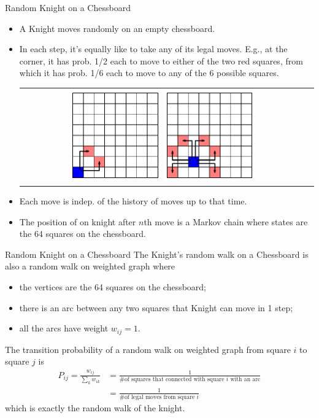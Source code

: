 \documentclass[letterpaper, mathserif]{beamer}
\begin{document}
\begin{frame}{Random Knight on a Chessboard}
\begin{itemize}
\item A Knight moves randomly on an empty chessboard.
\item In each step, it's equally like to take any of its legal moves. E.g.,
at the corner, it has prob. 1/2 each to move to either of the two red squares,
from which it has prob. 1/6 each to move to any of the 6 possible squares.
\begin{center}
\begin{tabular}{cc}
\includegraphics[width=0.33\textwidth]{./RandomKnight/KnightMoves00}
\includegraphics[width=0.33\textwidth]{./RandomKnight/KnightMoves21}
\end{tabular}
\end{center}
\item Each move is indep. of the history of moves up to that time.
\item The position of on knight after $n$th move
is a Markov chain where states are the 64 squares on the chessboard.
\end{itemize}
\end{frame}
\begin{frame}{Random Knight on a Chessboard}
The Knight's random walk on a Chessboard is also a random walk on weighted graph where
\begin{itemize}
\item the vertices are the 64 squares on the chessboard;
\item there is an arc between any two squares that Knight can move in 1 step;
\item all the arcs have weight $w_{ij}=1$.
\end{itemize}
The transition probability of a random walk on weighted graph from square $i$ to square $j$ is
\begin{align*}
P_{ij} = \frac{w_{ij}}{\sum_k w_{ik}}
&= \frac{1}{\text{\# of squares that connected with square $i$ with an arc}}\\
&= \frac{1}{\text{\# of legal moves from square $i$}}
\end{align*}
which is exactly the random walk of the knight.
\end{frame}
\end{document}
